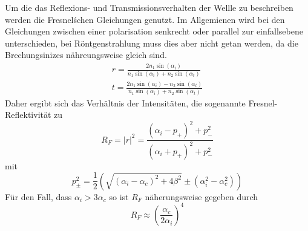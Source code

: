         Um die das Reflexions- und Transmissionsverhalten der Wellle zu beschreiben werden die Fresnel\'schen Gleichungen genutzt.
        Im Allgemienen wird bei den Gleichungen zwischen einer polarisation senkrecht oder parallel zur einfallsebene unterschieden, bei Röntgenstrahlung muss dies aber nicht getan werden, da die Brechungsinizes nähreungsweise gleich sind.
        \begin{align}
            r = \frac{2n_1 \sin\left(\alpha_i\right)}{ n_1 \sin\left(\alpha_i\right) +n_2 \sin\left(\alpha_t\right) } \\
            t = \frac{2n_1 \sin\left(\alpha_i\right) - n_2 \sin\left(\alpha_t\right) }{ n_1 \sin\left(\alpha_i\right) +n_2 \sin\left(\alpha_t\right) }
        \end{align}
        Daher ergibt sich das Verhältnis der Intensitäten, die sogenannte Fresnel-Reflektivität zu 
        \begin{equation}
            \label{eqn:fresnel}
            R_F = |r|^2 = \frac{\left(\alpha_i - p_+\right)^2 + p_-^2}{\left(\alpha_i + p_+\right)^2 + p_-^2}
        \end{equation}
        mit
        \begin{equation}
            p_\pm^2 = \frac{1}{2} \left(\sqrt{\left( \alpha_i - \alpha_c\right)^2 + 4\beta^2} \pm \left( \alpha_i^2 - \alpha_c^2\right)\right)
        \end{equation}
        Für den Fall, dass $\alpha_i > 3\alpha_c$ so ist $R_F$ näherungsweise gegeben durch
        \begin{equation}
            R_F ≈ \left(\frac{\alpha_c}{2\alpha_i}\right)^4
        \end{equation}
